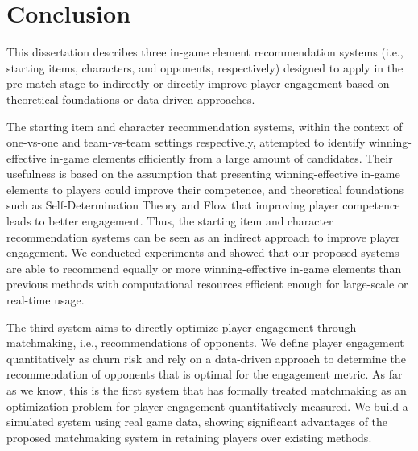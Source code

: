 \chapter{Conclusion} %

\label{chapter:conclusion} 

This dissertation describes three in-game element recommendation systems (i.e., starting items, characters, and opponents, respectively) designed to apply in the pre-match stage to indirectly or directly improve player engagement based on theoretical foundations or data-driven approaches. 

The starting item and character recommendation systems, within the context of one-vs-one and team-vs-team settings respectively, attempted to identify winning-effective in-game elements efficiently from a large amount of candidates. Their usefulness is based on the assumption that presenting winning-effective in-game elements to players could improve their competence, and theoretical foundations such as Self-Determination Theory and Flow that improving player competence leads to better engagement. Thus, the starting item and character recommendation systems can be seen as an indirect approach to improve player engagement. We conducted experiments and showed that our proposed systems are able to recommend equally or more winning-effective in-game elements than previous methods with computational resources efficient enough for large-scale or real-time usage. 

The third system aims to directly optimize player engagement through matchmaking, i.e., recommendations of opponents. We define player engagement quantitatively as churn risk and rely on a data-driven approach to determine the recommendation of opponents that is optimal for  the engagement metric. As far as we know, this is the first system that has formally treated matchmaking as an optimization problem for player engagement quantitatively measured. We build a simulated system using real game data, showing significant advantages of the proposed matchmaking system in retaining players over existing methods.



